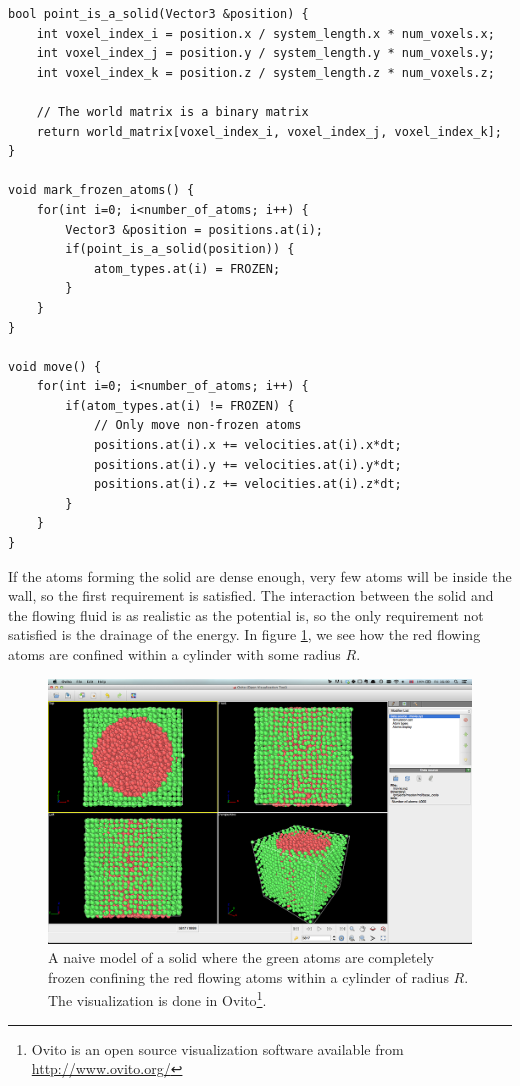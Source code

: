 \begin{lstlisting}[caption=Example code showing how to mark atoms within a solid., label=lst:md_simple_solid]
bool point_is_a_solid(Vector3 &position) {
	int voxel_index_i = position.x / system_length.x * num_voxels.x;
	int voxel_index_j = position.y / system_length.y * num_voxels.y;
	int voxel_index_k = position.z / system_length.z * num_voxels.z;

	// The world matrix is a binary matrix
	return world_matrix[voxel_index_i, voxel_index_j, voxel_index_k];
}

void mark_frozen_atoms() {
	for(int i=0; i<number_of_atoms; i++) {
		Vector3 &position = positions.at(i);
		if(point_is_a_solid(position)) {
			atom_types.at(i) = FROZEN;
		}
	}
}

void move() {
	for(int i=0; i<number_of_atoms; i++) {
		if(atom_types.at(i) != FROZEN) {
			// Only move non-frozen atoms
			positions.at(i).x += velocities.at(i).x*dt;
			positions.at(i).y += velocities.at(i).y*dt;
			positions.at(i).z += velocities.at(i).z*dt;
		}
	}
}
\end{lstlisting}
If the atoms forming the solid are dense enough, very few atoms will be inside the wall, so the first requirement is satisfied. The interaction between the solid and the flowing fluid is as realistic as the potential is, so the only requirement not satisfied is the drainage of the energy. In figure \ref{fig:md_simple_solid}, we see how the red flowing atoms are confined within a cylinder with some radius $R$. 

\begin{figure}[h]
\begin{center}
\includegraphics[width=1.0\textwidth, trim=0cm 0cm 0cm 0cm, clip]{MD/figures/solid_model.png}
\end{center}
\caption{A naive model of a solid where the green atoms are completely frozen confining the red flowing atoms within a cylinder of radius $R$. The visualization is done in Ovito\footnote{Ovito is an open source visualization software available from \url{http://www.ovito.org/}}.}
\label{fig:md_simple_solid}
\end{figure}

